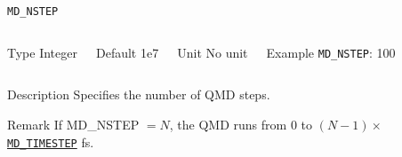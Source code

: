 \begin{frame}[allowframebreaks]{\texttt{MD\_NSTEP}} \label{MD_NSTEP}
\vspace*{-12pt}
\begin{columns}
\begin{block}{Type}
Integer
\end{block}

\begin{block}{Default}
1e7
\end{block}

\begin{block}{Unit}
No unit
\end{block}

\begin{block}{Example}
\texttt{MD\_NSTEP}: 100
\end{block}
\end{columns}

\begin{block}{Description}
Specifies the number of QMD steps.
\end{block}

\begin{block}{Remark}
If MD\_NSTEP $= N$, the QMD runs from $0$ to $(N-1) \times$ \hyperlink{MD_TIMESTEP}{\texttt{MD\_TIMESTEP}} fs.  
\end{block}

\end{frame}



